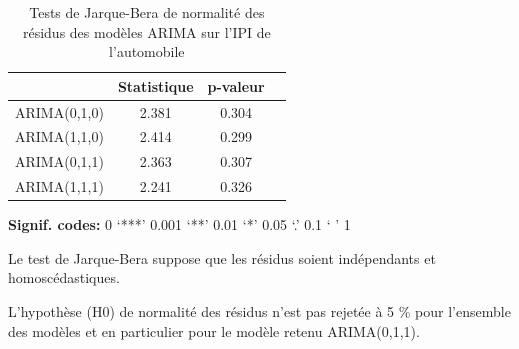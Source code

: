 \documentclass[,french]{article}
\begin{document}
\begin{table}[!h]

\caption{\label{tab:tabjb}Tests de Jarque-Bera de normalité des résidus des modèles ARIMA sur l'IPI de l'automobile}
\centering
\begin{threeparttable}
\begin{tabular}[t]{lccc}
\toprule
  & Statistique & p-valeur & \\
\midrule
ARIMA(0,1,0) & 2.381 & 0.304 & \\
ARIMA(1,1,0) & 2.414 & 0.299 & \\
ARIMA(0,1,1) & 2.363 & 0.307 & \\
ARIMA(1,1,1) & 2.241 & 0.326 & \\
\bottomrule
\end{tabular}
\begin{tablenotes}
\item \hspace{-0.4cm}\textbf{Signif. codes: }0 `***' 0.001 `**' 0.01 `*' 0.05 `.' 0.1 ` ' 1
\item Le test de Jarque-Bera suppose que les résidus soient indépendants et homoscédastiques.
\item L’hypothèse (H0) de normalité des résidus n’est pas rejetée à 5 \% pour l’ensemble des modèles et en particulier pour le modèle retenu ARIMA(0,1,1).
\end{tablenotes}
\end{threeparttable}
\end{table}
\end{document}
